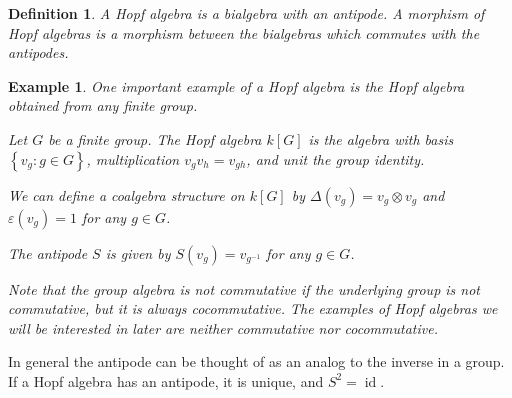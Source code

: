 \documentclass[]{article}
\newtheorem{defn}[theorem]{Definition}
\newtheorem{example}[theorem]{Example}
\newcommand{\id}{\operatorname{id}}
\numberwithin{equation}{subsection}
\begin{document}
\begin{defn}
    A \emph{Hopf algebra} is a bialgebra with an antipode. A morphism of Hopf
    algebras is a morphism between the bialgebras which commutes with the
    antipodes. 
\end{defn}

\begin{example}
    \label{groupalgebra}
    One important example of a Hopf algebra is the Hopf algebra obtained from
    any finite group. 

    Let $G$ be a finite group. The Hopf algebra $k[G]$ is the algebra with
    basis $\left\{ v_g: g \in G \right\}$, multiplication $v_g v_h = v_{gh}$,
    and unit the group identity. 

    We can define a coalgebra structure on $k[G]$ by $\Delta(v_g) = v_g \otimes v_g$
    and $\varepsilon(v_g) = 1$ for any $g \in G$.

    The antipode $S$ is given by $S(v_g) = v_{g^{-1}}$ for any $g \in G$.

    Note that the group algebra is not commutative if the underlying group is
    not commutative, but it is always cocommutative. The examples of Hopf
    algebras we will be interested in later are neither commutative nor
    cocommutative. 
\end{example}

In general the antipode can be thought of as an analog to the inverse in a
group. If a Hopf algebra has an antipode, it is unique, and $S^2 = \id$.
\end{document}
